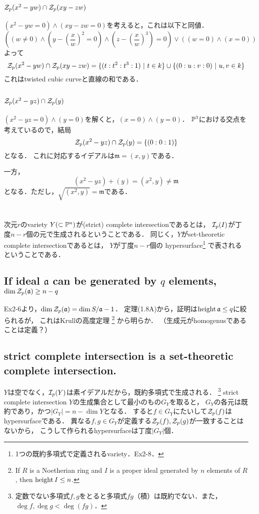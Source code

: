 \documentclass[a4paper]{jarticle}
\newcommand{\I}[1]{\mathfrak{#1}}
\begin{document}
\section{} %
    \subsection{$\mathcal{Z}_p(x^2-yw) \cap \mathcal{Z}_p(xy-zw)$}
    $(x^2-yw=0) \land (xy-zw=0)$を考えると，これは以下と同値．
    \[ ((w \neq 0) \land (y-(\frac{x}{w})^2=0) \land (z-(\frac{x}{w})^3)=0) \lor ((w=0) \land (x=0)) \]
    よって
    \[
        \mathcal{Z}_p(x^2-yw) \cap \mathcal{Z}_p(xy-zw)
        =\{(t: t^2: t^3: 1) ~|~ t \in k\} \cup \{ (0:u:v:0) ~|~ u,v \in k\}
    \]
    これはtwisted cubic curveと直線の和である．

    \subsection{$\mathcal{Z}_p(x^2-yz) \cap \mathcal{Z}_p(y)$}
    $(x^2-yz=0) \land (y=0)$を解くと，$(x=0) \land (y=0)$．
    $\mathbb{P}^3$における交点を考えているので，結局
    \[ \mathcal{Z}_p(x^2-yz) \cap \mathcal{Z}_p(y)=\{(0:0:1)\} \]となる．
    これに対応するイデアルは$\I{m}=(x,y)$である．

    一方，
    \[ (x^2-yz)+(y)=(x^2, y) \neq \I{m} \]
    となる．ただし，$\sqrt{(x^2, y)}=\I{m}$である．

\section{} %
    次元$r$のvariety $Y (\subset \mathbb{P}^n)$が(strict) complete intersectionであるとは，
    $\mathcal{I}_p(I)$が丁度$n-r$個の元で生成されるということである．
    同じく，$Y$がset-theoretic complete intersectionであるとは，
    $Y$が丁度$n-r$個の
    hypersurface\footnote{1つの既約多項式で定義されるvariety．Ex2-8．}
    で表されるということである．

    \subsection{If ideal $\I{a}$ can be generated by $q$ elements, $\dim \zerosp(\I{a}) \geq n-q$}
    Ex2-6より，$\dim \zerosp(\I{a})=\dim S/\I{a}-1$．
    定理(1.8A)から，証明は$\height \I{a} \leq q$に絞られるが，
    これはKrullの高度定理
    \footnote{If $R$ is a Noetherian ring and $I$ is a proper ideal generated by $n$ elements of $R$, then $\operatorname{height} I \leq n$.}
    から明らか．
    （生成元がhomogenusであることは定義？）

    \subsection{strict complete intersection is a set-theoretic complete intersection.}
    $Y$は空でなく，$\mathcal{I}_p(Y)$は素イデアルだから，既約多項式で生成される．
    \footnote{定数でない多項式$f,g$をとると多項式$fg$（積）は既約でない．また，$\deg f, \deg g < \deg (fg)$．}
    strict complete intersection $Y$の生成集合として最小のもの$G_Y$を取ると，
    $G_Y$の各元は既約であり，かつ$|G_Y|=n-\dim Y$となる．
    すると$f \in G_Y$にたいして$\mathcal{Z}_p(f)$はhypersurfaceである．
    異なる$f,g \in G_Y$が定義する$\mathcal{Z}_p(f), \mathcal{Z}_p(g)$が一致することはないから，
    こうして作られるhypersurfaceは丁度$|G_Y|$個．
\end{document}
